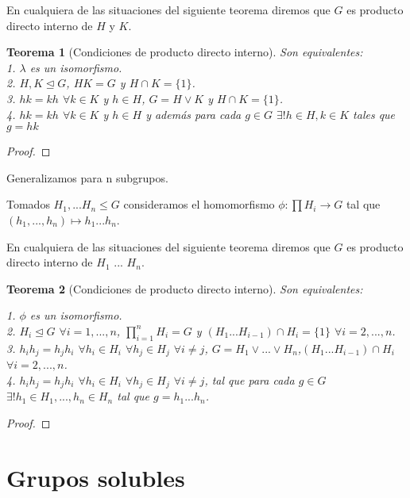 \documentclass{article}
\theoremstyle{theorem-style}  %
\newtheorem{theorem}{Teorema}[section]  %
\theoremstyle{definition-style}
\theoremstyle{example-style}
\begin{document}
En cualquiera de las situaciones del siguiente teorema diremos que $G$ es producto directo interno de $H$ y $K$.

\begin{theorem}[Condiciones de producto directo interno]
Son equivalentes:\\
1. $\lambda$ es un isomorfismo.\\
2. $H,K \trianglelefteq G$, $HK = G$ y $H \cap K = \{1\}$.\\
3. $hk = kh$ $\forall k \in K$ y $h \in H$, $G = H \lor K$ y $H \cap K = \{1\}$.\\
4. $hk = kh$ $\forall k \in K$ y $h \in H$ y además para cada $g \in G$ $\exists  ! h \in H, k \in K$ tales que $g = hk$
\end{theorem}
\begin{proof}

\end{proof}

Generalizamos para n subgrupos.

Tomados $H_1,...H_n \le G$ consideramos el homomorfismo $\phi:\prod H_i \rightarrow G$ tal que $(h_1,...,h_n) \mapsto h_1...h_n$.

En cualquiera de las situaciones del siguiente teorema diremos que $G$ es producto directo interno de $H_1$ ... $H_n$.

\begin{theorem}[Condiciones de producto directo interno]
Son equivalentes:

1. $\phi$ es un isomorfismo.\\
2. $H_i \trianglelefteq G$ $\forall i = 1,...,n$, $\prod_{i=1}^{n} H_i = G$ y $(H_1...H_{i-1}) \cap H_i = \{1\}$ $\forall i = 2,...,n$.\\
3. $h_i h_j = h_j h_i$ $\forall h_i \in H_i$ $\forall h_j \in H_j$ $\forall i \neq j$, $G = H_1 \lor ... \lor H_n$,$(H_1...H_{i-1})\cap H_i$ $\forall i=2,...,n$.\\
4. $h_ih_j = h_jh_i$ $\forall h_i \in H_i$ $\forall h_j \in H_j$ $\forall i \neq j$, tal que para cada $g \in G$ $\exists ! h_1 \in H_1,...,h_n \in H_n$ tal que $g = h_1...h_n$.
\end{theorem}
\begin{proof}

\end{proof}

\newpage

\section{Grupos solubles}
\end{document}
